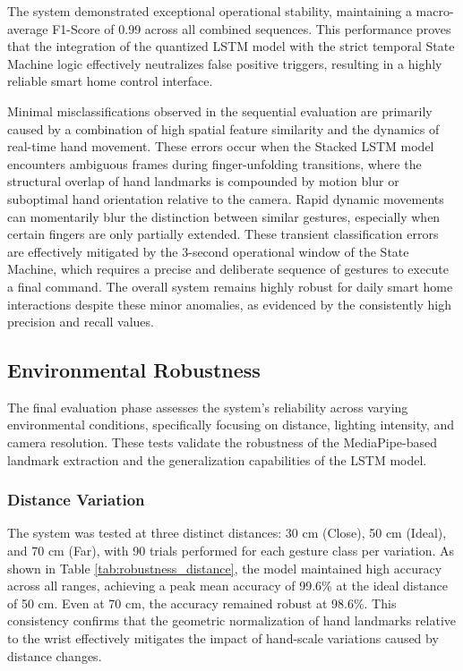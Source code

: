 The system demonstrated exceptional operational stability, maintaining a macro-average F1-Score of 0.99 across all combined sequences. This performance proves that the integration of the quantized LSTM model with the strict temporal State Machine logic effectively neutralizes false positive triggers, resulting in a highly reliable smart home control interface. 

Minimal misclassifications observed in the sequential evaluation are primarily caused by a combination of high spatial feature similarity and the dynamics of real-time hand movement. These errors occur when the Stacked LSTM model encounters ambiguous frames during finger-unfolding transitions, where the structural overlap of hand landmarks is compounded by motion blur or suboptimal hand orientation relative to the camera. Rapid dynamic movements can momentarily blur the distinction between similar gestures, especially when certain fingers are only partially extended. These transient classification errors are effectively mitigated by the 3-second operational window of the State Machine, which requires a precise and deliberate sequence of gestures to execute a final command. The overall system remains highly robust for daily smart home interactions despite these minor anomalies, as evidenced by the consistently high precision and recall values.

\subsection{Environmental Robustness}

The final evaluation phase assesses the system's reliability across varying environmental conditions, specifically focusing on distance, lighting intensity, and camera resolution. These tests validate the robustness of the MediaPipe-based landmark extraction and the generalization capabilities of the LSTM model.

\subsubsection{Distance Variation}
The system was tested at three distinct distances: 30 cm (Close), 50 cm (Ideal), and 70 cm (Far), with 90 trials performed for each gesture class per variation. As shown in Table \ref{tab:robustness_distance}, the model maintained high accuracy across all ranges, achieving a peak mean accuracy of 99.6\% at the ideal distance of 50 cm. Even at 70 cm, the accuracy remained robust at 98.6\%. This consistency confirms that the geometric normalization of hand landmarks relative to the wrist effectively mitigates the impact of hand-scale variations caused by distance changes.


